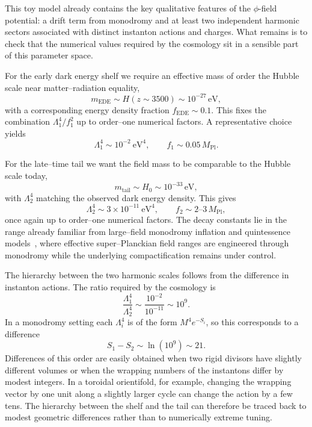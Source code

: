 \documentclass[a4paper,11pt]{article}
\begin{document}
This toy model already contains the key qualitative features of the $\phi$-field potential: a drift term from monodromy and at least two independent harmonic sectors associated with distinct instanton actions and charges. What remains is to check that the numerical values required by the cosmology sit in a sensible part of this parameter space.

For the early dark energy shelf we require an effective mass of order the Hubble scale near matter–radiation equality,
\begin{equation}
    m_{\text{EDE}} \sim H(z \sim 3500) \sim 10^{-27}\,\text{eV},
\end{equation}
with a corresponding energy density fraction $f_{\text{EDE}} \sim 0.1$. This fixes the combination $\Lambda_1^4 / f_1^2$ up to order–one numerical factors. A representative choice yields
\begin{equation}
    \Lambda_1^4 \sim 10^{-2}~\text{eV}^4, \qquad f_1 \sim 0.05\,M_{\text{Pl}}.
\end{equation}

For the late–time tail we want the field mass to be comparable to the Hubble scale today,
\begin{equation}
    m_{\text{tail}} \sim H_0 \sim 10^{-33}\,\text{eV},
\end{equation}
with $\Lambda_2^4$ matching the observed dark energy density. This gives
\begin{equation}
    \Lambda_2^4 \sim 3 \times 10^{-11}~\text{eV}^4, \qquad f_2 \sim 2\text{--}3\,M_{\text{Pl}},
\end{equation}
once again up to order–one numerical factors. The decay constants lie in the range already familiar from large–field monodromy inflation and quintessence models~\cite{Baumann_McAllister}, where effective super–Planckian field ranges are engineered through monodromy while the underlying compactification remains under control.

The hierarchy between the two harmonic scales follows from the difference in instanton actions. The ratio required by the cosmology is
\begin{equation}
    \frac{\Lambda_1^4}{\Lambda_2^4} \sim \frac{10^{-2}}{10^{-11}} \sim 10^{9}.
\end{equation}
In a monodromy setting each $\Lambda_i^4$ is of the form $M^4 e^{-S_i}$, so this corresponds to a difference
\begin{equation}
    S_1 - S_2 \sim \ln(10^{9}) \sim 21.
\end{equation}
Differences of this order are easily obtained when two rigid divisors have slightly different volumes or when the wrapping numbers of the instantons differ by modest integers. In a toroidal orientifold, for example, changing the wrapping vector by one unit along a slightly larger cycle can change the action by a few tens. The hierarchy between the shelf and the tail can therefore be traced back to modest geometric differences rather than to numerically extreme tuning.
\end{document}
